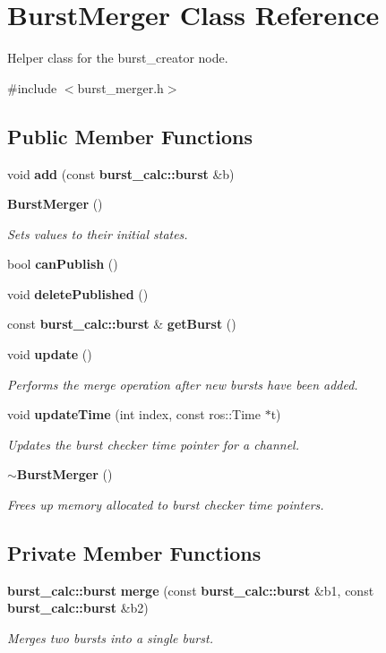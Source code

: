 \section{\-Burst\-Merger \-Class \-Reference}
\label{classBurstMerger}


\-Helper class for the burst\-\_\-creator node.  




{\ttfamily \#include $<$burst\-\_\-merger.\-h$>$}

\subsection*{\-Public \-Member \-Functions}
\begin{DoxyCompactItemize}
\item 
void {\bf add} (const {\bf burst\-\_\-calc\-::burst} \&b)
\item 
{\bf \-Burst\-Merger} ()
\begin{DoxyCompactList}\small\item\em \-Sets values to their initial states. \end{DoxyCompactList}\item 
bool {\bf can\-Publish} ()
\item 
void {\bf delete\-Published} ()
\item 
const {\bf burst\-\_\-calc\-::burst} \& {\bf get\-Burst} ()
\item 
void {\bf update} ()
\begin{DoxyCompactList}\small\item\em \-Performs the merge operation after new bursts have been added. \end{DoxyCompactList}\item 
void {\bf update\-Time} (int index, const ros\-::\-Time $\ast$t)
\begin{DoxyCompactList}\small\item\em \-Updates the burst checker time pointer for a channel. \end{DoxyCompactList}\item 
{\bf $\sim$\-Burst\-Merger} ()
\begin{DoxyCompactList}\small\item\em \-Frees up memory allocated to burst checker time pointers. \end{DoxyCompactList}\end{DoxyCompactItemize}
\subsection*{\-Private \-Member \-Functions}
\begin{DoxyCompactItemize}
\item 
{\bf burst\-\_\-calc\-::burst} {\bf merge} (const {\bf burst\-\_\-calc\-::burst} \&b1, const {\bf burst\-\_\-calc\-::burst} \&b2)
\begin{DoxyCompactList}\small\item\em \-Merges two bursts into a single burst. \end{DoxyCompactList}\end{DoxyCompactItemize}
